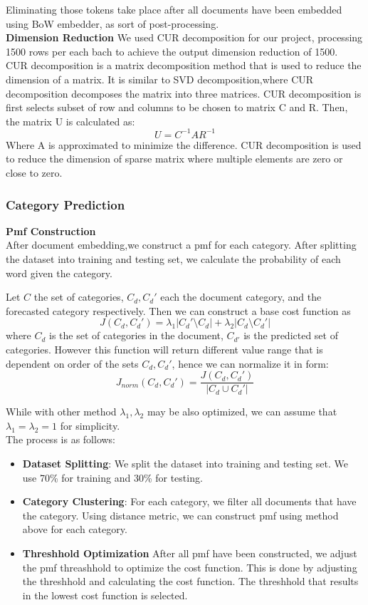 \documentclass[12pt]{article}
\begin{document}
Eliminating those tokens take place after all documents have been embedded using BoW embedder, as sort of post-processing.\\

\textbf{Dimension Reduction}
We used CUR decomposition for our project, processing 1500 rows per each bach to achieve the output dimension reduction of 1500.\\
CUR decomposition is a matrix decomposition method that is used to reduce the dimension of a matrix. It is similar to SVD decomposition,where CUR decomposition decomposes the matrix into three matrices. CUR decomposition is first selects subset of row and columns to be chosen to matrix C and R. Then, the matrix U is calculated as:
\[
    U = C^{-1}A R^{-1}
\]
Where A is approximated to minimize the difference.
CUR decomposition is used to reduce the dimension of sparse matrix where multiple elements are zero or close to zero.\\

\subsubsection{Category Prediction}
\textbf{Pmf Construction}\\
After document embedding,we construct a pmf for each category. After splitting the dataset into training and testing set, we calculate the probability of each word given the category.

Let $C$ the set of categories, $C_d, C_d'$ each the document category, and the forecasted category respectively. Then we can construct a base cost function as 
\[
    J(C_d, C_d') = \lambda_1|C_d'\setminus C_d| + \lambda_2|C_d\setminus C_d'|
\]
where $C_d$ is the set of categories in the document, $C_{d'}$ is the predicted set of categories. However this function will return different value range that is dependent on order of the sets $C_d, C_d'$, hence we can normalize it in form:
\[
    J_{norm}(C_d, C_d') = \frac{J(C_d, C_d')}{|C_d\cup C_d'|}
\]

While with other method $\lambda_1, \lambda_2$ may be also optimized, we can assume that $\lambda_1=\lambda_2=1$ for simplicity.\\

The process is as follows:
\begin{itemize}
    \item \textbf{Dataset Splitting}: We split the dataset into training and testing set. We use 70\% for training and 30\% for testing.
    \item \textbf{Category Clustering}: For each category, we filter all documents that have the category. Using distance metric, we can construct pmf using method above for each category.
    \item \textbf{Threshhold Optimization} After all pmf have been constructed, we adjust the pmf threashhold to optimize the cost function. This is done by adjusting the threshhold and calculating the cost function. The threshhold that results in the lowest cost function is selected.
\end{itemize}
\end{document}
